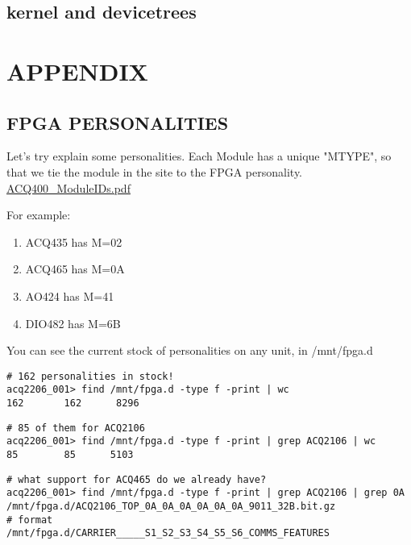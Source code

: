 \documentclass[]{article}
\begin{document}
\subsection{kernel and devicetrees}

\pagebreak

\section{APPENDIX}
	
	
\subsection{FPGA PERSONALITIES}\label{sec:fpga-personalities}

Let's try explain some personalities. Each Module has a unique "MTYPE", so that we tie the module in the site to the FPGA personality. 
\href{https://www.d-tacq.com/resources/Products_ACQ400_ModuleIDs.pdf}{ACQ400_ModuleIDs.pdf}

For example:
\begin{enumerate}
	\item ACQ435 has M=02
	\item ACQ465 has M=0A
	\item AO424  has M=41
	\item DIO482 has M=6B
\end{enumerate}

You can see the current stock of personalities on any  unit, in /mnt/fpga.d

\begin{lstlisting}[style=bashstyle,frame=single]
# 162 personalities in stock!
acq2206_001> find /mnt/fpga.d -type f -print | wc
162       162      8296
\end{lstlisting}

\begin{lstlisting}[style=bashstyle,frame=single]
# 85 of them for ACQ2106
acq2206_001> find /mnt/fpga.d -type f -print | grep ACQ2106 | wc
85        85      5103
\end{lstlisting}

\begin{lstlisting}[style=bashstyle,frame=single]
# what support for ACQ465 do we already have?
acq2206_001> find /mnt/fpga.d -type f -print | grep ACQ2106 | grep 0A
/mnt/fpga.d/ACQ2106_TOP_0A_0A_0A_0A_0A_0A_9011_32B.bit.gz
# format
/mnt/fpga.d/CARRIER_____S1_S2_S3_S4_S5_S6_COMMS_FEATURES
\end{lstlisting}
\end{document}
